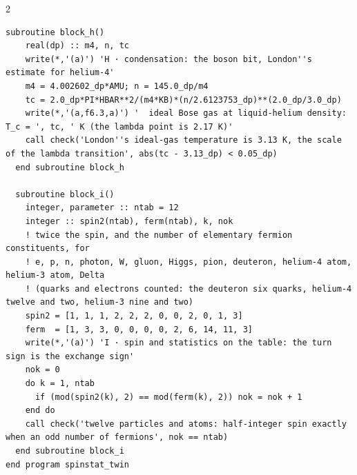 \documentclass[10pt]{article}
\begin{document}
\begin{multicols}{2}
\begin{Verbatim}[fontsize=\fontsize{6.0}{6.9}\selectfont,breaklines,breakanywhere,breaksymbolleft={}]
  subroutine block_h()
    real(dp) :: m4, n, tc
    write(*,'(a)') 'H · condensation: the boson bit, London''s estimate for helium-4'
    m4 = 4.002602_dp*AMU; n = 145.0_dp/m4
    tc = 2.0_dp*PI*HBAR**2/(m4*KB)*(n/2.6123753_dp)**(2.0_dp/3.0_dp)
    write(*,'(a,f6.3,a)') '  ideal Bose gas at liquid-helium density: T_c = ', tc, ' K (the lambda point is 2.17 K)'
    call check('London''s ideal-gas temperature is 3.13 K, the scale of the lambda transition', abs(tc - 3.13_dp) < 0.05_dp)
  end subroutine block_h

  subroutine block_i()
    integer, parameter :: ntab = 12
    integer :: spin2(ntab), ferm(ntab), k, nok
    ! twice the spin, and the number of elementary fermion constituents, for
    ! e, p, n, photon, W, gluon, Higgs, pion, deuteron, helium-4 atom, helium-3 atom, Delta
    ! (quarks and electrons counted: the deuteron six quarks, helium-4 twelve and two, helium-3 nine and two)
    spin2 = [1, 1, 1, 2, 2, 2, 0, 0, 2, 0, 1, 3]
    ferm  = [1, 3, 3, 0, 0, 0, 0, 2, 6, 14, 11, 3]
    write(*,'(a)') 'I · spin and statistics on the table: the turn sign is the exchange sign'
    nok = 0
    do k = 1, ntab
      if (mod(spin2(k), 2) == mod(ferm(k), 2)) nok = nok + 1
    end do
    call check('twelve particles and atoms: half-integer spin exactly when an odd number of fermions', nok == ntab)
  end subroutine block_i
end program spinstat_twin
\end{Verbatim}
\end{multicols}
\end{document}
